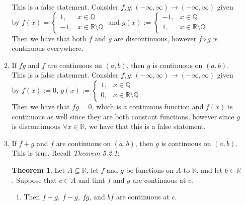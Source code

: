 \documentclass[12pt,letterpaper]{article}
\newcommand{\R}{\mathbb{R}}
\newcommand{\Q}{\mathbb{Q}}
\theoremstyle{case}
\theoremstyle{definition}
\newtheorem*{theorem*}{Theorem}
\begin{document}
\begin{enumerate}
\begin{enumerate}
				This is a false statement. Consider $f,g:(-\infty, \infty) \to (-\infty, \infty)$ given by $f(x)=\begin{cases}
					1, & x \in \Q \\
					-1, & x \in \R \setminus \Q
				\end{cases}$ and $g(x):=\begin{cases}
					-1, & x \in \Q \\
					1, & x \in \R \setminus \Q
				\end{cases}$\\
				Then we have that both $f$ and $g$ are discontinuous, however $f \circ g$ is continuous everywhere. \\
				\item If $fg$ and $f$ are continuous on $(a,b)$, then $g$ is continuous on $(a,b)$.\\
				
				This is a false statement. Consider $f,g:(-\infty, \infty) \to (-\infty, \infty)$ given by $f(x):=0$, $g(x):=\begin{cases}
					1, & x \in \Q \\
					0, & x \in \R \setminus \Q
				\end{cases}$\\
				Then we have that $fg=0$, which is a continuous function and $f(x)$ is continuous as well since they are both constant functions, however since $g$ is discontinuous $\forall x \in \R$, we have that this is a false statement.\\
				\item If $f+g$ and $f$ are continuous on $(a,b)$, then $g$ is continuous on $(a,b)$.\\
				
				This is true. Recall \textit{Theorem 5.2.1}:
				\begin{theorem*}
					Let $A \subseteq \R$, let $f$ and $g$ be functions on $A$ to $\R$, and let $b \in \R$. Suppose that $c \in A$ and that $f$ and $g$ are continuous at $c$.
					\begin{enumerate}
						\item Then $f+g,\ f-g,\ fg$, and $bf$ are continuous at $c$.
						

\end{enumerate}
\end{theorem*}
\end{enumerate}
\end{enumerate}
\end{document}
